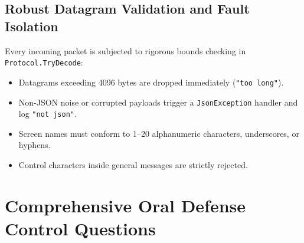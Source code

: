 \documentclass[11pt,a4paper]{article}
\begin{document}
\subsection{Robust Datagram Validation and Fault Isolation}
Every incoming packet is subjected to rigorous bounds checking in \texttt{Protocol.TryDecode}:
\begin{itemize}[noitemsep]
    \item Datagrams exceeding 4096 bytes are dropped immediately (\texttt{"too long"}).
    \item Non-JSON noise or corrupted payloads trigger a \texttt{JsonException} handler and log \texttt{"not json"}.
    \item Screen names must conform to 1--20 alphanumeric characters, underscores, or hyphens.
    \item Control characters inside general messages are strictly rejected.
\end{itemize}

\section{Comprehensive Oral Defense Control Questions}
\end{document}

